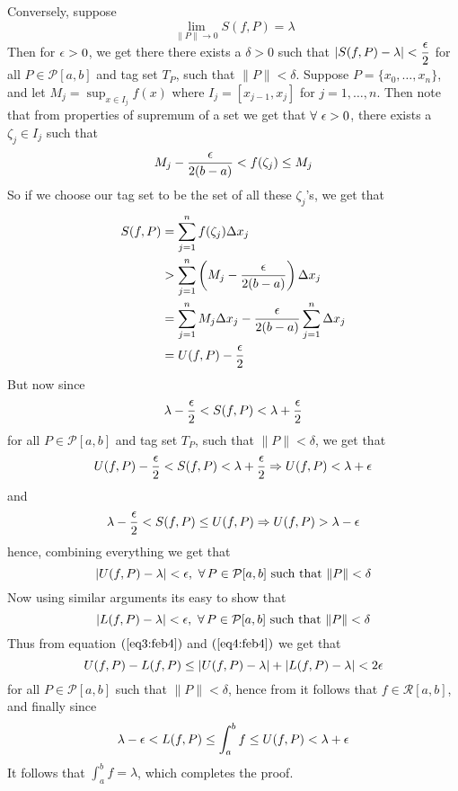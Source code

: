 \begin{prf}
    Conversely, suppose \[ \lim_{\|P\| \to 0} S(f,P) = \lambda \]
    Then for $\epsilon > 0$, we get there there exists a $\delta > 0$ such that $|S(f,P) - \lambda| < \displaystyle{\frac{\epsilon}{2}}$ for all $P \in \mathcal{P}[a,b]$ and tag set $T_P$, such that $\|P\| < \delta$. Suppose $P = \{x_0, \dots, x_n\}$, and let $M_j = \sup_{x \in I_j} f(x)$ where $I_j = [x_{j-1},x_j]$ for $j = 1, \dots, n$. Then note that from properties of supremum of a set we get that $\forall \ \epsilon > 0$, there exists a $\zeta_j \in I_j$ such that \[ M_j - \frac{\epsilon}{2(b-a)} < f(\zeta_j) \leq M_j \] So if we choose our tag set to be the set of all these $\zeta_j$'s, we get that 
    \begin{align*}
        S(f,P) &= \sum_{j=1}^n f(\zeta_j) \Delta x_j \\ 
               &> \sum_{j=1}^n \left(M_j - \frac{\epsilon}{2(b-a)}\right) \Delta x_j \\ 
               &= \sum_{j=1}^n M_j \Delta x_j - \frac{\epsilon}{2(b-a)} \sum_{j=1}^n \Delta x_j \\ 
               &= U(f,P) - \frac{\epsilon}{2}
    \end{align*}
    But now since 
    \[
        \lambda-\frac{\epsilon}{2} < S(f,P) < \lambda + \frac{\epsilon}{2}  
    \]
    for all $P \in \mathcal{P}[a,b]$ and tag set $T_P$, such that $\|P\| < \delta$, we get that 
    \[
        U(f,P) - \frac{\epsilon}{2} < S(f,P) < \lambda + \frac{\epsilon}{2} \Rightarrow U(f,P) < \lambda + \epsilon   
    \]
    and 
    \[
        \lambda - \frac{\epsilon}{2} < S(f,P) \leq U(f,P) \Rightarrow U(f,P) > \lambda - \epsilon   
    \]
    hence, combining everything we get that 
    \begin{equation}\label{eq3:feb4}
        |U(f,P) - \lambda| < \epsilon, \ \forall \, P \in \mathcal{P}[a,b] \mbox{ such that } \|P\| < \delta
    \end{equation}
    Now using similar arguments its easy to show that 
    \begin{equation}\label{eq4:feb4}
        |L(f,P) - \lambda| < \epsilon, \ \forall \, P \in \mathcal{P}[a,b] \mbox{ such that } \|P\| < \delta
    \end{equation}
    Thus from equation $(\ref{eq3:feb4})$ and $(\ref{eq4:feb4})$ we get that 
    \[
        U(f,P) - L(f,P) \leq |U(f,P) - \lambda| + |L(f,P)-\lambda| < 2\epsilon  
    \] 
    for all $P \in \mathcal{P}[a,b]$ such that $\|P\| < \delta$, hence from  it follows that $f \in \mathcal{R}[a,b]$, and finally since 
    \[ \lambda - \epsilon < L(f,P) \leq \int_a^b f \leq U(f,P) < \lambda + \epsilon \]
    It follows that $\int_a^b f = \lambda$, which completes the proof.
\end{prf}

